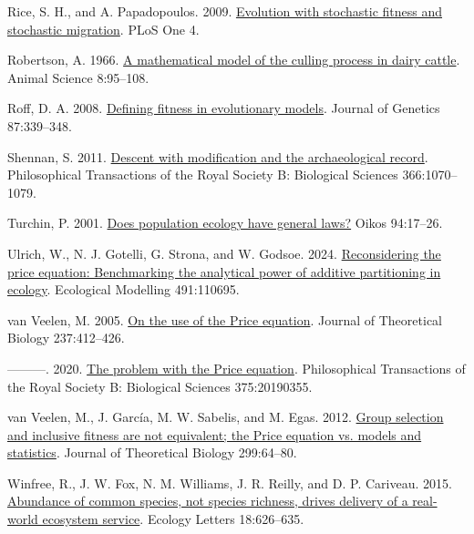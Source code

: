 \documentclass[
]{article}
\newlength{\cslhangindent}
\newlength{\cslentryspacingunit} %
\newenvironment{CSLReferences}[2] %
 {%
  \setlength{\parindent}{0pt}
  \ifodd #1
  \let\oldpar\par
  \def\par{\hangindent=\cslhangindent\oldpar}
  \fi
  \setlength{\parskip}{#2\cslentryspacingunit}
 }%
 {}
\begin{document}
\begin{CSLReferences}{0}{0}
\leavevmode{}%
Rice, S. H., and A. Papadopoulos. 2009.
\href{https://doi.org/10.1371/journal.pone.0007130}{{Evolution with
stochastic fitness and stochastic migration}}. PLoS One 4.

\leavevmode{}%
Robertson, A. 1966. \href{https://doi.org/10.1017/S0003356100037752}{{A
mathematical model of the culling process in dairy cattle}}. Animal
Science 8:95--108.

\leavevmode{}%
Roff, D. A. 2008.
\href{https://doi.org/10.1007/s12041-008-0056-9}{{Defining fitness in
evolutionary models}}. Journal of Genetics 87:339--348.

\leavevmode{}%
Shennan, S. 2011. \href{https://doi.org/10.1098/rstb.2010.0380}{{Descent
with modification and the archaeological record}}. Philosophical
Transactions of the Royal Society B: Biological Sciences 366:1070--1079.

\leavevmode{}%
Turchin, P. 2001.
\href{https://doi.org/10.1034/j.1600-0706.2001.11310.x}{Does population
ecology have general laws?} Oikos 94:17--26.

\leavevmode{}%
Ulrich, W., N. J. Gotelli, G. Strona, and W. Godsoe. 2024.
\href{https://doi.org/10.1016/j.ecolmodel.2024.110695}{Reconsidering the
price equation: Benchmarking the analytical power of additive
partitioning in ecology}. Ecological Modelling 491:110695.

\leavevmode{}%
van Veelen, M. 2005.
\href{https://doi.org/10.1016/j.jtbi.2005.04.026}{{On the use of the
Price equation}}. Journal of Theoretical Biology 237:412--426.

\leavevmode{}%
---------. 2020. \href{https://doi.org/10.1098/rstb.2019.0355}{{The
problem with the Price equation}}. Philosophical Transactions of the
Royal Society B: Biological Sciences 375:20190355.

\leavevmode{}%
van Veelen, M., J. García, M. W. Sabelis, and M. Egas. 2012.
\href{https://doi.org/10.1016/j.jtbi.2011.07.025}{{Group selection and
inclusive fitness are not equivalent; the Price equation vs. models and
statistics}}. Journal of Theoretical Biology 299:64--80.

\leavevmode{}%
Winfree, R., J. W. Fox, N. M. Williams, J. R. Reilly, and D. P.
Cariveau. 2015. \href{https://doi.org/10.1111/ele.12424}{{Abundance of
common species, not species richness, drives delivery of a real-world
ecosystem service}}. Ecology Letters 18:626--635.

\end{CSLReferences}
\end{document}
